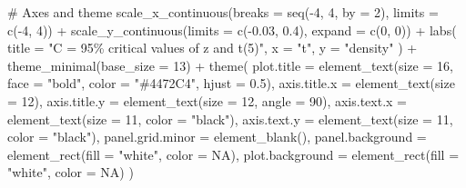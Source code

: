\documentclass[
  letterpaper,
  DIV=11,
  numbers=noendperiod]{scrreprt}
\newenvironment{Shaded}{\begin{snugshade}}{\end{snugshade}}
\newcommand{\AttributeTok}[1]{\textcolor[rgb]{0.40,0.45,0.13}{#1}}
\newcommand{\CommentTok}[1]{\textcolor[rgb]{0.37,0.37,0.37}{#1}}
\newcommand{\ConstantTok}[1]{\textcolor[rgb]{0.56,0.35,0.01}{#1}}
\newcommand{\DecValTok}[1]{\textcolor[rgb]{0.68,0.00,0.00}{#1}}
\newcommand{\FloatTok}[1]{\textcolor[rgb]{0.68,0.00,0.00}{#1}}
\newcommand{\FunctionTok}[1]{\textcolor[rgb]{0.28,0.35,0.67}{#1}}
\newcommand{\NormalTok}[1]{\textcolor[rgb]{0.00,0.23,0.31}{#1}}
\newcommand{\SpecialCharTok}[1]{\textcolor[rgb]{0.37,0.37,0.37}{#1}}
\newcommand{\StringTok}[1]{\textcolor[rgb]{0.13,0.47,0.30}{#1}}
\begin{document}
\begin{Shaded}
\begin{Highlighting}[]
  \CommentTok{\# Axes and theme}
  \FunctionTok{scale\_x\_continuous}\NormalTok{(}\AttributeTok{breaks =} \FunctionTok{seq}\NormalTok{(}\SpecialCharTok{{-}}\DecValTok{4}\NormalTok{, }\DecValTok{4}\NormalTok{, }\AttributeTok{by =} \DecValTok{2}\NormalTok{), }\AttributeTok{limits =} \FunctionTok{c}\NormalTok{(}\SpecialCharTok{{-}}\DecValTok{4}\NormalTok{, }\DecValTok{4}\NormalTok{)) }\SpecialCharTok{+}
  \FunctionTok{scale\_y\_continuous}\NormalTok{(}\AttributeTok{limits =} \FunctionTok{c}\NormalTok{(}\SpecialCharTok{{-}}\FloatTok{0.03}\NormalTok{, }\FloatTok{0.4}\NormalTok{), }\AttributeTok{expand =} \FunctionTok{c}\NormalTok{(}\DecValTok{0}\NormalTok{, }\DecValTok{0}\NormalTok{)) }\SpecialCharTok{+}
  \FunctionTok{labs}\NormalTok{(}
    \AttributeTok{title =} \StringTok{"C = 95\% critical values of z and t(5)"}\NormalTok{,}
    \AttributeTok{x =} \StringTok{"t"}\NormalTok{,}
    \AttributeTok{y =} \StringTok{"density"}
\NormalTok{  ) }\SpecialCharTok{+}
  \FunctionTok{theme\_minimal}\NormalTok{(}\AttributeTok{base\_size =} \DecValTok{13}\NormalTok{) }\SpecialCharTok{+}
  \FunctionTok{theme}\NormalTok{(}
    \AttributeTok{plot.title =} \FunctionTok{element\_text}\NormalTok{(}\AttributeTok{size =} \DecValTok{16}\NormalTok{, }\AttributeTok{face =} \StringTok{"bold"}\NormalTok{, }\AttributeTok{color =} \StringTok{"\#4472C4"}\NormalTok{, }\AttributeTok{hjust =} \FloatTok{0.5}\NormalTok{),}
    \AttributeTok{axis.title.x =} \FunctionTok{element\_text}\NormalTok{(}\AttributeTok{size =} \DecValTok{12}\NormalTok{),}
    \AttributeTok{axis.title.y =} \FunctionTok{element\_text}\NormalTok{(}\AttributeTok{size =} \DecValTok{12}\NormalTok{, }\AttributeTok{angle =} \DecValTok{90}\NormalTok{),}
    \AttributeTok{axis.text.x =} \FunctionTok{element\_text}\NormalTok{(}\AttributeTok{size =} \DecValTok{11}\NormalTok{, }\AttributeTok{color =} \StringTok{"black"}\NormalTok{),}
    \AttributeTok{axis.text.y =} \FunctionTok{element\_text}\NormalTok{(}\AttributeTok{size =} \DecValTok{11}\NormalTok{, }\AttributeTok{color =} \StringTok{"black"}\NormalTok{),}
    \AttributeTok{panel.grid.minor =} \FunctionTok{element\_blank}\NormalTok{(),}
    \AttributeTok{panel.background =} \FunctionTok{element\_rect}\NormalTok{(}\AttributeTok{fill =} \StringTok{"white"}\NormalTok{, }\AttributeTok{color =} \ConstantTok{NA}\NormalTok{),}
    \AttributeTok{plot.background =} \FunctionTok{element\_rect}\NormalTok{(}\AttributeTok{fill =} \StringTok{"white"}\NormalTok{, }\AttributeTok{color =} \ConstantTok{NA}\NormalTok{)}
\NormalTok{  )}


\end{Highlighting}
\end{Shaded}
\end{document}
